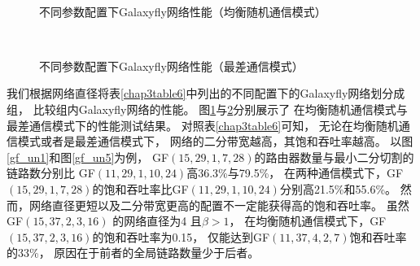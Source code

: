 \begin{figure}[t]
  \centering
  \begin{minipage}[t]{\textwidth}
    \centering
    \subfloat[网络直径$D=2$]{
      \texttt{[image: gf\_ur\_a]}
      \label{gf_un1}
    }
    \subfloat[网络直径$D=3$]{
      \texttt{[image: gf\_ur\_b]}
      \label{gf_un2}
    }
    \\
    \subfloat[网络直径$D=4$]{
      \texttt{[image: gf\_ur\_c]}
      \label{gf_un3}
    }
    \subfloat[网络直径$D=5$]{
      \texttt{[image: gf\_ur\_d]}
      \label{gf_un4}
    }
    \caption{不同参数配置下Galaxyfly网络性能（均衡随机通信模式）}
    \label{chap3figure10a}
  \end{minipage}
\end{figure}
\begin{figure}
  \centering
  \begin{minipage}[t]{\textwidth}
    \centering
    \subfloat[网络直径$D=2$]{
      \texttt{[image: gf\_w\_a]}
      \label{gf_un5}
    }
    \subfloat[网络直径$D=3$]{
      \texttt{[image: gf\_w\_b]}
      \label{gf_un6}
    }
    \\
    \subfloat[网络直径$D=4$]{
      \texttt{[image: gf\_w\_c]}
      \label{gf_un7}
    }
    \subfloat[网络直径$D=5$]{
      \texttt{[image: gf\_w\_d]}
      \label{gf_un8}
    }
    \caption{不同参数配置下Galaxyfly网络性能（最差通信模式）}
    \label{chap3figure10b}
  \end{minipage}
\end{figure}

我们根据网络直径将表\ref{chap3table6}中列出的不同配置下的Galaxyfly网络划分成组，
比较组内Galaxyfly网络的性能。
图\ref{chap3figure10a}与\ref{chap3figure10b}分别展示了
在均衡随机通信模式与最差通信模式下的性能测试结果。
对照表\ref{chap3table6}可知，
无论在均衡随机通信模式或者是最差通信模式下，
网络的二分带宽越高，其饱和吞吐率越高。
以图\ref{gf_un1}和图\ref{gf_un5}为例，
GF$(15,29,1,7,28)$的路由器数量与最小二分切割的链路数分别比
GF$(11,29,1,10,24)$高36.3\%与79.5\%，
在两种通信模式下，GF$(15,29,1,7,28)$的饱和吞吐率比GF$(11,29,1,10,24)$分别高21.5\%和55.6\%。
然而，网络直径更短以及二分带宽更高的配置不一定能获得高的饱和吞吐率。
虽然GF$(15,37,2,3,16)$ 的网络直径为4 且$\beta>1$，
在均衡随机通信模式下，GF$(15,37,2,3,16)$的饱和吞吐率为0.15，
仅能达到GF$(11,37,4,2,7)$饱和吞吐率的33\%，
原因在于前者的全局链路数量少于后者。


